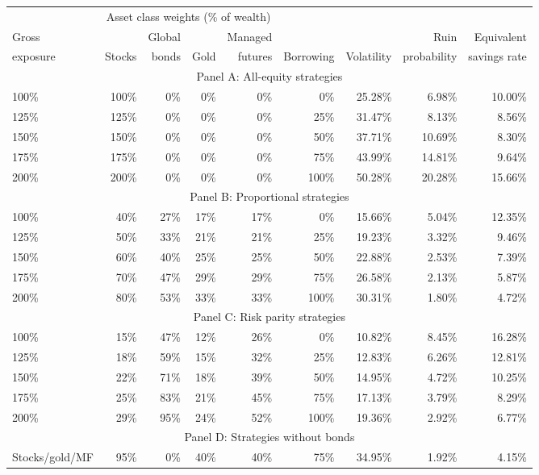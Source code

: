 \begin{table}[p]
{\small\setlength{\tabcolsep}{2.2pt}\begin{tabular}{lrrrrrrrr}\toprule
 & \multicolumn{4}{c}{Asset class weights (\% of wealth)} & & & & \\ \cmidrule(lr){2-5}
Gross & & Global & & Managed & & & Ruin & Equivalent \\
exposure & Stocks & bonds & Gold & futures & Borrowing & Volatility & probability & savings rate \\ \midrule
\multicolumn{9}{c}{Panel A: All-equity strategies} \\
100\% & 100\% & 0\% & 0\% & 0\% & 0\% & 25.28\% & 6.98\% & 10.00\% \\
125\% & 125\% & 0\% & 0\% & 0\% & 25\% & 31.47\% & 8.13\% & 8.56\% \\
150\% & 150\% & 0\% & 0\% & 0\% & 50\% & 37.71\% & 10.69\% & 8.30\% \\
175\% & 175\% & 0\% & 0\% & 0\% & 75\% & 43.99\% & 14.81\% & 9.64\% \\
200\% & 200\% & 0\% & 0\% & 0\% & 100\% & 50.28\% & 20.28\% & 15.66\% \\
\multicolumn{9}{c}{Panel B: Proportional strategies} \\
100\% & 40\% & 27\% & 17\% & 17\% & 0\% & 15.66\% & 5.04\% & 12.35\% \\
125\% & 50\% & 33\% & 21\% & 21\% & 25\% & 19.23\% & 3.32\% & 9.46\% \\
150\% & 60\% & 40\% & 25\% & 25\% & 50\% & 22.88\% & 2.53\% & 7.39\% \\
175\% & 70\% & 47\% & 29\% & 29\% & 75\% & 26.58\% & 2.13\% & 5.87\% \\
200\% & 80\% & 53\% & 33\% & 33\% & 100\% & 30.31\% & 1.80\% & 4.72\% \\
\multicolumn{9}{c}{Panel C: Risk parity strategies} \\
100\% & 15\% & 47\% & 12\% & 26\% & 0\% & 10.82\% & 8.45\% & 16.28\% \\
125\% & 18\% & 59\% & 15\% & 32\% & 25\% & 12.83\% & 6.26\% & 12.81\% \\
150\% & 22\% & 71\% & 18\% & 39\% & 50\% & 14.95\% & 4.72\% & 10.25\% \\
175\% & 25\% & 83\% & 21\% & 45\% & 75\% & 17.13\% & 3.79\% & 8.29\% \\
200\% & 29\% & 95\% & 24\% & 52\% & 100\% & 19.36\% & 2.92\% & 6.77\% \\
\multicolumn{9}{c}{Panel D: Strategies without bonds} \\
Stocks/gold/MF & 95\% & 0\% & 40\% & 40\% & 75\% & 34.95\% & 1.92\% & 4.15\% \\

\end{tabular}}
\end{table}
